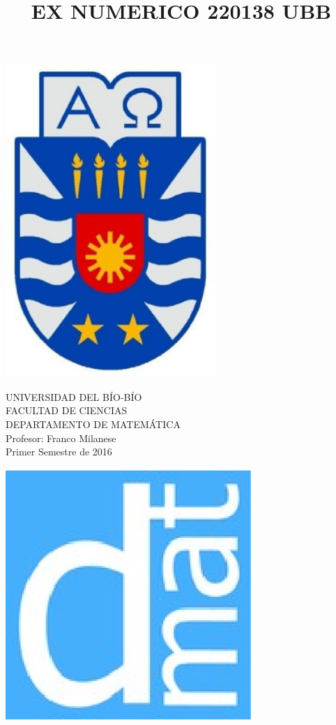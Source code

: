 \documentclass[11pt]{article}
\begin{document}
\title{EX NUMERICO 220138 UBB}

{\begin{minipage}{2cm}
\hspace*{1cm}\includegraphics[width=0.6\textwidth]{escubo-ubb.eps}
\end{minipage}
\begin{minipage}{12cm}
\small
{\bf \rm 
{
\begin{center}
{\footnotesize UNIVERSIDAD DEL B\'IO-B\'IO} \\
{\scriptsize FACULTAD DE CIENCIAS}  \\
{\scriptsize DEPARTAMENTO DE MATEM\'ATICA}  \\
{\scriptsize Profesor:  Franco Milanese}\\
{\scriptsize Primer Semestre de 2016}
\end{center}
}}
\end{minipage}}
{\begin{minipage}{2cm}
\hspace*{-0.5cm}\vspace*{-0.05cm}\includegraphics[width=0.7\textwidth]{escudo-dmat.eps}
\end{minipage}}
\end{document}
